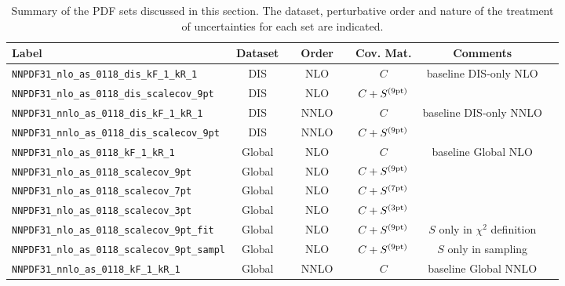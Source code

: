 \begin{table}[t]
  \centering
\footnotesize
  \renewcommand*{\arraystretch}{1.50}
  \begin{tabular}{lccccc}
    Label                   & Dataset  & $\quad$Order$\quad$  & Cov. Mat. &  Comments \\
    \toprule
        {\tt NNPDF31\_nlo\_as\_0118\_dis\_kF\_1\_kR\_1}  &  DIS   &   NLO  & $C$  & baseline DIS-only NLO  \\
        {\tt NNPDF31\_nlo\_as\_0118\_dis\_scalecov\_9pt} &  DIS   &   NLO  & $C+S^{(\rm 9pt)}$  &  \\
        \midrule
        {\tt NNPDF31\_nnlo\_as\_0118\_dis\_kF\_1\_kR\_1}  &  DIS   &   NNLO  & $C$  & baseline DIS-only NNLO  \\
        {\tt NNPDF31\_nnlo\_as\_0118\_dis\_scalecov\_9pt} &  DIS   &   NNLO  & $C+S^{(\rm 9pt)}$  &  \\
        \midrule
        {\tt NNPDF31\_nlo\_as\_0118\_kF\_1\_kR\_1}  &  Global   &   NLO  & $C$  & baseline Global NLO  \\
        {\tt NNPDF31\_nlo\_as\_0118\_scalecov\_9pt}  &  Global   &   NLO  & $C+S^{(\rm 9pt)}$  &  \\
        {\tt NNPDF31\_nlo\_as\_0118\_scalecov\_7pt}  &  Global   &   NLO  & $C+S^{(\rm 7pt)}$  &  \\
        {\tt NNPDF31\_nlo\_as\_0118\_scalecov\_3pt}  &  Global   &   NLO  & $C+S^{(\rm 3pt)}$  &  \\
        \midrule
         {\tt NNPDF31\_nlo\_as\_0118\_scalecov\_9pt\_fit}  &  Global   &   NLO  & $C+S^{(\rm 9pt)}$  & $S$ only in $\chi^2$
            definition \\
            {\tt NNPDF31\_nlo\_as\_0118\_scalecov\_9pt\_sampl}  &  Global   &   NLO  & $C+S^{(\rm 9pt)}$  & $S$ only in sampling \\
            \midrule
        {\tt NNPDF31\_nnlo\_as\_0118\_kF\_1\_kR\_1}  &  Global   &  NNLO  & $C$  & baseline Global NNLO  \\
            \bottomrule
  \end{tabular}
  \vspace{0.3cm}
  \caption{\small Summary of the PDF sets discussed in this
    section. The dataset, perturbative order and nature of the
    treatment of uncertainties for each set are indicated.
    \label{tab:thcovmatFits}
  }
  \end{table}
